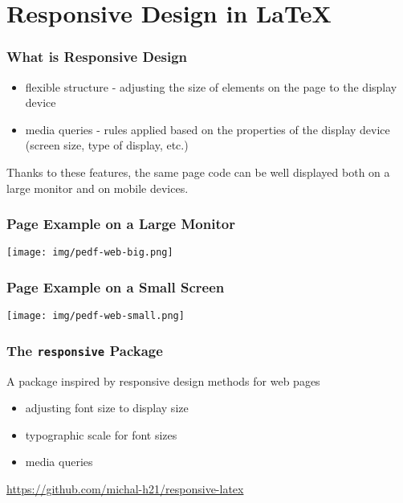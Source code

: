 \section{Responsive Design in \LaTeX}



\begin{frame}
   \frametitle{What is Responsive Design}
   \begin{itemize}
     \item flexible structure - adjusting the size of elements on the page to the display device
     \item media queries - rules applied based on the properties of the display device (screen size, type of display, etc.)
   \end{itemize}

   Thanks to these features, the same page code can be well displayed both on a large monitor and on mobile devices.
\end{frame}

\begin{frame}
  \frametitle{Page Example on a Large Monitor}
  \begin{center}
    \texttt{[image: img/pedf-web-big.png]}
  \end{center}
\end{frame}

\begin{frame}
  \frametitle{Page Example on a Small Screen}
  \begin{center}
    \texttt{[image: img/pedf-web-small.png]}
  \end{center}
\end{frame}

\begin{frame}
  \frametitle{The \texttt{responsive} Package}

  A package inspired by responsive design methods for web pages
  \begin{itemize}
  \item adjusting font size to display size
  \item typographic scale for font sizes
  \item media queries
  \end{itemize}
  \url{https://github.com/michal-h21/responsive-latex}
\end{frame}

